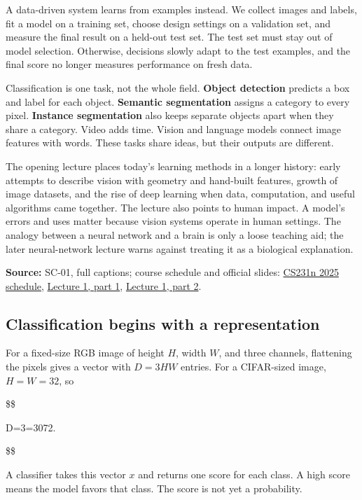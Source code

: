 A data-driven system learns from examples instead. We collect images and labels, fit a model on a training set, choose design settings on a validation set, and measure the final result on a held-out test set. The test set must stay out of model selection. Otherwise, decisions slowly adapt to the test examples, and the final score no longer measures performance on fresh data.

Classification is one task, not the whole field. \textbf{Object detection} predicts a box and label for each object. \textbf{Semantic segmentation} assigns a category to every pixel. \textbf{Instance segmentation} also keeps separate objects apart when they share a category. Video adds time. Vision and language models connect image features with words. These tasks share ideas, but their outputs are different.

The opening lecture places today's learning methods in a longer history: early attempts to describe vision with geometry and hand-built features, growth of image datasets, and the rise of deep learning when data, computation, and useful algorithms came together. The lecture also points to human impact. A model's errors and uses matter because vision systems operate in human settings. The analogy between a neural network and a brain is only a loose teaching aid; the later neural-network lecture warns against treating it as a biological explanation.

\textbf{Source:} SC-01, full captions; course schedule and official slides: \href{https://cs231n.stanford.edu/2025/schedule.html}{CS231n 2025 schedule}, \href{https://cs231n.stanford.edu/slides/2025/lecture_1_part_1.pdf}{Lecture 1, part 1}, \href{https://cs231n.stanford.edu/slides/2025/lecture_1_part_2.pdf}{Lecture 1, part 2}.

\subsection{Classification begins with a representation}\label{04-visual-computing-ii-ch031-classification-begins-with-a-representation}

For a fixed-size RGB image of height \(H\), width \(W\), and three channels, flattening the pixels gives a vector with \(D=3HW\) entries. For a CIFAR-sized image, \(H=W=32\), so

\$\$

D=3=3072.

\$\$

A classifier takes this vector \(x\) and returns one score for each class. A high score means the model favors that class. The score is not yet a probability.

